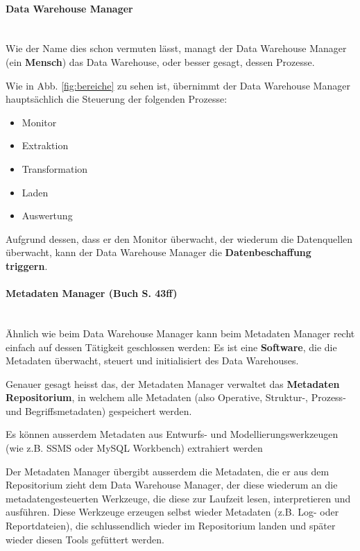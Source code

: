 \documentclass[a4paper, 11pt, nofootinbib]{article}
\begin{document}
\paragraph{Data Warehouse Manager}\mbox{}\\
Wie der Name dies schon vermuten lässt, managt der Data Warehouse Manager (ein \textbf{Mensch}) das Data Warehouse, oder besser gesagt, dessen Prozesse. 

Wie in Abb. \ref{fig:bereiche} zu sehen ist, übernimmt der Data Warehouse Manager hauptsächlich die Steuerung der folgenden Prozesse:

\begin{itemize}
	\item Monitor
	\item Extraktion
	\item Transformation
	\item Laden
	\item Auswertung
\end{itemize}
\vspace{10px}

\noindent Aufgrund dessen, dass er den Monitor überwacht, der wiederum die Datenquellen überwacht, kann der Data Warehouse Manager die \textbf{Datenbeschaffung triggern}.

\paragraph{Metadaten Manager (Buch S. 43ff)}\mbox{}\\
Ähnlich wie beim Data Warehouse Manager kann beim Metadaten Manager recht einfach auf dessen Tätigkeit geschlossen werden: Es ist eine \textbf{Software}, die die Metadaten überwacht, steuert und initialisiert des Data Warehouses.

\vspace{10px}

\noindent Genauer gesagt heisst das, der Metadaten Manager verwaltet das \textbf{Metadaten Repositorium}, in welchem alle Metadaten (also Operative, Struktur-, Prozess- und Begriffsmetadaten) gespeichert werden.

Es können ausserdem Metadaten aus Entwurfs- und Modellierungswerkzeugen (wie z.B. SSMS oder MySQL Workbench) extrahiert werden

\vspace{10px}

\noindent Der Metadaten Manager übergibt ausserdem die Metadaten, die er aus dem Repositorium zieht dem Data Warehouse Manager, der diese wiederum an die metadatengesteuerten Werkzeuge, die diese zur Laufzeit lesen, interpretieren und ausführen. Diese Werkzeuge erzeugen selbst wieder Metadaten (z.B. Log- oder Reportdateien), die schlussendlich wieder im Repositorium landen und später wieder diesen Tools gefüttert werden. 
\end{document}
